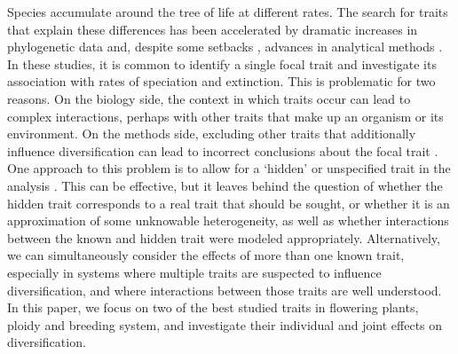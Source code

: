Species accumulate around the tree of life at different rates.
The search for traits that explain these differences has been accelerated by dramatic increases in phylogenetic data and, despite some setbacks \citep{maddison_2015, rabosky_2015}, advances in analytical methods \citep{maddison_2007, fitzjohn_2009, goldberg_2012, beaulieu_2016}. %
In these studies, it is common to identify a single focal trait and investigate its association with rates of speciation and extinction. %
This is problematic for two reasons.
On the biology side, the context in which traits occur can lead to complex interactions, perhaps with other traits that make up an organism or its environment.
On the methods side, excluding other traits that additionally influence diversification can lead to incorrect conclusions about the focal trait \citep{rabosky_2015, beaulieu_2016}.
One approach to this problem is to allow for a `hidden' or unspecified trait in the analysis \citep{beaulieu_2016}. %
This can be effective, but it leaves behind the question of whether the hidden trait corresponds to a real trait that should be sought, or whether it is an approximation of some unknowable heterogeneity, as well as whether interactions between the known and hidden trait were modeled appropriately.
Alternatively, we can simultaneously consider the effects of more than one known trait, especially in systems where multiple traits are suspected to influence diversification, and where interactions between those traits are well understood.
In this paper, we focus on two of the best studied traits in flowering plants, ploidy and breeding system, and investigate their individual and joint effects on diversification.

%
%
%

